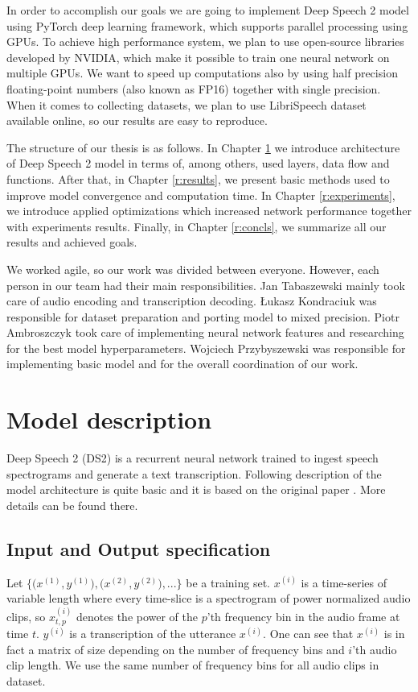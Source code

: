 \documentclass[licencjacka,en]{pracamgr}
\begin{document}
	In order to accomplish our goals we are going to implement Deep Speech 2 model using PyTorch deep learning framework, which supports parallel processing using GPUs. To achieve high performance system, we plan to use open-source libraries developed by NVIDIA, which make it possible to train one neural network on multiple GPUs. We want to speed up computations also by using half precision floating-point numbers (also known as FP16) together with single precision. When it comes to collecting datasets, we plan to use LibriSpeech \cite{LIBRI} dataset available online, so our results are easy to reproduce.
	
	The structure of our thesis is as follows. In Chapter \ref{r:desc} we introduce architecture of Deep Speech 2 model in terms of, among others, used layers, data flow and functions. After that, in Chapter \ref{r:results}, we present basic methods used to improve model convergence and computation time. In Chapter \ref{r:experiments}, we introduce applied optimizations which increased network performance together with experiments results. Finally, in Chapter \ref{r:concls}, we summarize all our results and achieved goals.
	
	We worked agile, so our work was divided between everyone. However, each person in our team had their main responsibilities. Jan Tabaszewski mainly took care of audio encoding and transcription decoding. Łukasz Kondraciuk was responsible for dataset preparation and porting model to mixed precision. Piotr Ambroszczyk took care of implementing neural network features and researching for the best model hyperparameters. Wojciech Przybyszewski was responsible for implementing basic model and for the overall coordination of our work.
	
	\chapter{Model description}\label{r:desc}
	
	Deep Speech 2 (DS2) is a recurrent neural network trained to ingest speech spectrograms and generate a text transcription.
	Following description of the model architecture is quite basic and it is based on the original paper \cite{DS2}. More details can be found there.
	
	\section{Input and Output specification} \label{sec:input}
	Let $\big\{\big(x^{(1)}, y^{(1)}\big), \big(x^{(2)}, y^{(2)}\big), ...\big\}$ be a training set. $x^{(i)}$ is a time-series of variable length where every time-slice is a spectrogram of power
	normalized audio clips, so $x^{(i)}_{t,p}$ denotes the power of the $p$’th frequency bin in the audio frame at time $t$. $y^{(i)}$ is a transcription of the utterance $x^{(i)}$. One can see that $x^{(i)}$ is in fact a matrix of size depending on the number of frequency bins and $i$'th audio clip length. We use the same number of frequency bins for all audio clips in dataset.
	
\end{document}
